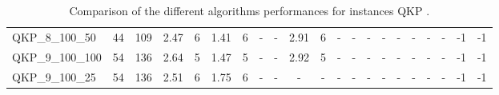 \begin{sidewaystable}[!ht]
{\begin{tabular}{lcccccccccccccccccccc}
QKP\_8\_100\_50 & 44 & 109 & 2.47 & 6 &  \textcolor{blue2}{1.41} & 6 &  - &  - & 2.91 & 6 &  - &  - &  - &  - &  - &  - &  - &  - & -1 & -1 \\
QKP\_9\_100\_100 & 54 & 136 & 2.64 & 5 &  \textcolor{blue2}{1.47} & 5 &  - &  - & 2.92 & 5 &  - &  - &  - &  - &  - &  - &  - &  - & -1 & -1 \\
QKP\_9\_100\_25 & 54 & 136 & 2.51 & 6 &  \textcolor{blue2}{1.75} & 6 &  - &  - &  - &  - &  - &  - &  - &  - &  - &  - &  - &  - & -1 & -1 \\
\bottomrule
\end{tabular}
}%
\caption{Comparison of the different algorithms performances for instances QKP .}
\label{tab:table_compare_QKP }
\end{sidewaystable}
